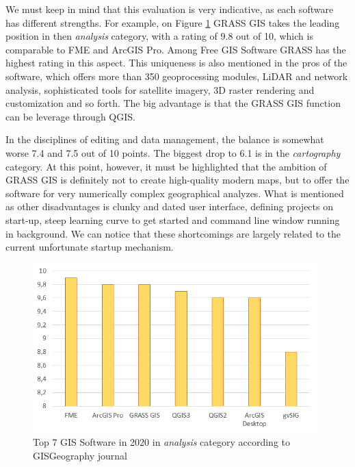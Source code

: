 \documentclass[a4paper,10pt,twoside]{article}
\begin{document}
\newpage
\noindent We must keep in mind that this evaluation is very indicative, as each software has different strengths. For example, on Figure \ref{fig:hodnoceni_analysis} GRASS GIS takes the leading position in then \textit{analysis} category, with a rating of 9.8 out of 10, which is comparable to FME and ArcGIS Pro. Among Free GIS Software GRASS has the highest rating in this aspect. This uniqueness is also mentioned in the pros of the software, which offers more than 350 geoprocessing modules, LiDAR and network analysis, sophisticated tools for satellite imagery, 3D raster rendering and customization and so forth.  The big advantage is that the GRASS GIS function can be leverage through QGIS. 

\newpage
In the disciplines of editing and data management, the balance is somewhat worse 7.4 and 7.5 out of 10 points. The biggest drop to 6.1 is in the \textit{cartography} category. At this point, however, it must be highlighted that the ambition of GRASS GIS is definitely not to create high-quality modern maps, but to offer the software for very numerically complex geographical analyzes. What is mentioned as other disadvantages is clunky and dated user interface, defining projects on start-up, steep learning curve to get started and command line window running in background. We can notice that these shortcomings are largely related to the current unfortunate startup mechanism.

\begin{figure}[hbt!] 
\begin{center}
\includegraphics[width=11cm]{../pictures/hodnoceni_analysis.png} 
\caption[Top 7 GIS Software in 2020 in \textit{analysis} category according to GISGeography journal]{Top 7 GIS Software in 2020 in \textit{analysis} category according to GISGeography journal}
\label{fig:hodnoceni_analysis}
\end{center}
\end{figure}
\end{document}
